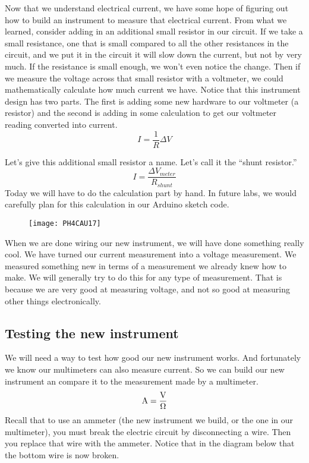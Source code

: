 Now that we understand electrical current, we have some hope of figuring out
how to build an instrument to measure that electrical current. From what we
learned, consider adding in an additional small resistor in our circuit. If
we take a small resistance, one that is small compared to all the other
resistances in the circuit, and we put it in the circuit it will slow down
the current, but not by very much. If the resistance is small enough, we
won't even notice the change. Then if we measure the voltage across that
small resistor with a voltmeter, we could mathematically calculate how much
current we have. Notice that this instrument design has two parts. The first
is adding some new hardware to our voltmeter (a resistor) and the second is
adding in some calculation to get our voltmeter reading converted into
current. 
\begin{equation*}
I=\frac{1}{R}\Delta V
\end{equation*}

Let's give this additional small resistor a name. Let's call it the
\textquotedblleft shunt resistor.\textquotedblright\ 
\begin{equation*}
I=\frac{\Delta V_{meter}}{R_{shunt}}
\end{equation*}%
Today we will have to do the calculation part by hand. In future labs, we
would carefully plan for this calculation in our Arduino sketch code.

\begin{figure}[h!]
	\centering
    \texttt{[image: PH4CAU17]}
\end{figure}

When we are done wiring our new instrument, we will have done something
really cool. We have turned our current measurement into a voltage
measurement. We measured something new in terms of a measurement we already
knew how to make. We will generally try to do this for any type of
measurement. That is because we are very good at measuring voltage, and not
so good at measuring other things electronically.

\subsection{Testing the new instrument}

We will need a way to test how good our new instrument works. And
fortunately we know our multimeters can also measure current. So we can
build our new instrument an compare it to the measurement made by a
multimeter. 
\begin{equation*}
\unit{A}=\frac{\unit{V}}{\unit{%
\Omega%
}}
\end{equation*}%
Recall that to use an ammeter (the new instrument we build, or the one in
our multimeter), you must break the electric circuit by disconnecting a
wire. Then you replace that wire with the ammeter. Notice that in the
diagram below that the bottom wire is now broken. 

